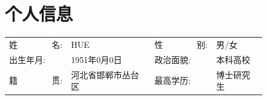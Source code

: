     \begin{figure}[h]
        \begin{minipage}{0.82\textwidth}
            \section{\makebox[\widthof{\faAddressCard}][c]{\color{WHU_Blue}{\faAddressCard}}\quad 个人信息}
            \begin{tabularx}{\linewidth}{p{}Xp{}X}
                姓\ \ \ \ \ \ \ \ 名: & HUE & 
                性\ \ \ \ \ \ \ \ 别: & 男/女  \\
                出生年月: & 1951年0月0日 & 
                政治面貌: & 本科高校 \\
                籍\ \ \ \ \ \ \ \ 贯: & 河北省邯郸市丛台区 & 
                最高学历: & 博士研究生 \\
            \end{tabularx}
        \end{minipage}
    \hspace{2em}
    \begin{minipage}{0.12\textwidth}
        \setlength{\fboxsep}{0pt}
    \end{minipage}
    \end{figure}
